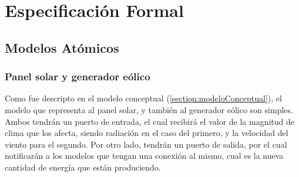 
\newcommand{\Reals}{{\rm I\!R}}

\newcommand{\deltaInt}[1]{
    \begin{algorithm}[H]
        \caption{$\delta_{int} (s)$}
        \begin{algorithmic}
        #1
        \end{algorithmic}
    \end{algorithm}
}
\newcommand{\deltaExt}[1]{
    \begin{algorithm}[H]
        \caption{$\delta_{ext} (s,e,x)$}
        \begin{algorithmic}
        #1
        \end{algorithmic}
    \end{algorithm}
}
\newcommand{\lambdaOut}[1]{
    \begin{algorithm}[H]
        \caption{$\lambda (s)$}
        \begin{algorithmic}
        #1
        \end{algorithmic}
    \end{algorithm}
}

\section{Especificación Formal}

\subsection{Modelos Atómicos}

\subsubsection{Panel solar y generador eólico}
Como fue descripto en el modelo conceptual (\ref{section:modeloConceptual}),
el modelo que representa al panel solar, y también al generador eólico son
simples. Ambos tendrán un puerto de entrada, el cual recibirá el valor de la
magnitud de clima que los afecta, siendo radiación en el caso del primero, y
la velocidad del viento para el segundo. Por otro lado, tendrán un puerto de
salida, por el cual notificarán a los modelos que tengan una conexión al
mismo, cual es la nueva cantidad de energía que están produciendo.


